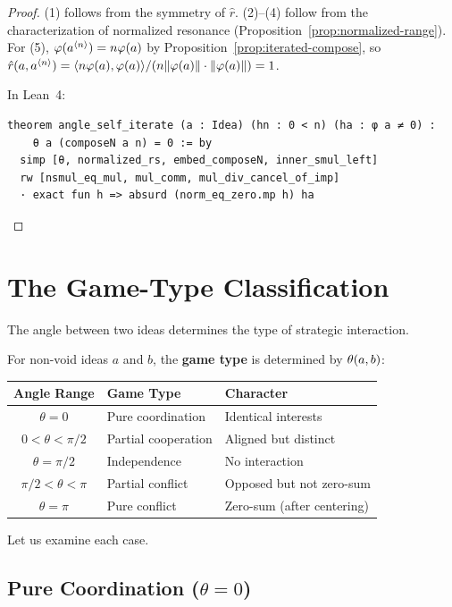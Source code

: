 \begin{proof}
(1) follows from the symmetry of $\hat{r}$. (2)--(4) follow from the
characterization of normalized resonance (Proposition~\ref{prop:normalized-range}).
For (5), $\varphi(a^{\langle n \rangle}) = n \varphi(a)$ by
Proposition~\ref{prop:iterated-compose}, so $\hat{r}(a, a^{\langle n \rangle})
= \langle n\varphi(a), \varphi(a) \rangle / (n\lVert \varphi(a) \rVert \cdot \lVert \varphi(a) \rVert) = 1$.

In Lean~4:
\begin{lstlisting}
theorem angle_self_iterate (a : Idea) (hn : 0 < n) (ha : φ a ≠ 0) :
    θ a (composeN a n) = 0 := by
  simp [θ, normalized_rs, embed_composeN, inner_smul_left]
  rw [nsmul_eq_mul, mul_comm, mul_div_cancel_of_imp]
  · exact fun h => absurd (norm_eq_zero.mp h) ha
\end{lstlisting}
\end{proof}


\section{The Game-Type Classification}

The angle between two ideas determines the type of strategic interaction.

\begin{definition}
\label{def:game-type}
For non-void ideas $a$ and $b$, the \textbf{game type} is determined by
$\theta(a,b)$:

\begin{center}
\begin{tabular}{cll}
\textbf{Angle Range} & \textbf{Game Type} & \textbf{Character} \\
\hline
$\theta = 0$ & Pure coordination & Identical interests \\
$0 < \theta < \pi/2$ & Partial cooperation & Aligned but distinct \\
$\theta = \pi/2$ & Independence & No interaction \\
$\pi/2 < \theta < \pi$ & Partial conflict & Opposed but not zero-sum \\
$\theta = \pi$ & Pure conflict & Zero-sum (after centering) \\
\end{tabular}
\end{center}
\end{definition}

Let us examine each case.


\subsection{Pure Coordination ($\theta = 0$)}

